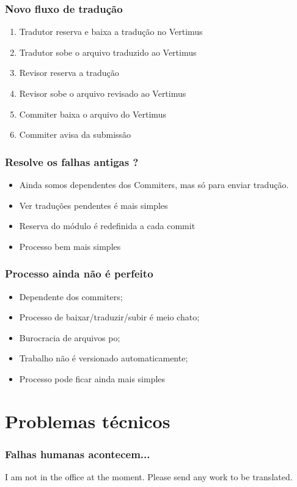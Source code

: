 \documentclass{beamer}
\begin{document}
\begin{frame}
    \frametitle[Vertimus]{Novo fluxo de tradução}
    \begin{enumerate}[<+->]
        \item Tradutor reserva e baixa a tradução no Vertimus
        \item Tradutor sobe o arquivo traduzido ao Vertimus
        \item Revisor reserva a tradução
        \item Revisor sobe o arquivo revisado ao Vertimus
        \item Commiter baixa o arquivo do Vertimus
        \item Commiter avisa da submissão
    \end{enumerate}
\end{frame}

\begin{frame}
    \frametitle{Resolve os falhas antigas ?}
    \begin{itemize}[<+->]
        \item Ainda somos dependentes dos Commiters, mas só para enviar tradução.
        \item Ver traduções pendentes é mais simples
        \item Reserva do módulo é redefinida a cada commit
        \item Processo bem mais simples
    \end{itemize}
\end{frame}

\begin{frame}
    \frametitle{Processo ainda não é perfeito }
    \begin{itemize}[<+->]
        \item Dependente dos commiters;
        \item Processo de baixar/traduzir/subir é meio chato;
        \item Burocracia de arquivos po;
        \item Trabalho não é versionado automaticamente;
        \item Processo pode ficar ainda mais simples
    \end{itemize}
\end{frame}

\section{Problemas técnicos}

\begin{frame}
  \frametitle{Falhas humanas acontecem...}
  
  I am not in the office at the moment. Please send any work to be translated.
  


\end{frame}
\end{document}
